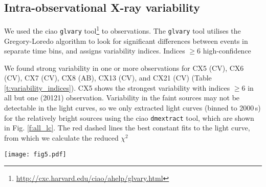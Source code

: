 \documentclass[fleqn,usenatbib]{mnras}
\newcommand{\craig}[1]{{\color{black}{#1}}}
\newcommand{\revised}[1]{{\color{black}{#1}}}
\begin{document}
\subsection{Intra-observational X-ray variability}
\label{sec:intra_observational_variability}
We used the {\sc ciao} {\tt glvary} tool\footnote{\url{http://cxc.harvard.edu/ciao/ahelp/glvary.html}} to 
\revised{search for variation of sources within} 
observations. The {\tt glvary} tool utilises the Gregory-Loredo algorithm \citep{Gregory92} to look for significant differences between events in separate time bins, and %
assigns variability indices. %
Indices %
$\geq 6$ %
\revised{indicate}
high-confidence \craig{($P>90$\% conf.)} 
\revised{variability.}

We found strong variability in one or more observations for CX5 (CV), CX6 (CV), CX7 (CV), CX8 (AB), CX13 (CV), and CX21 (CV) %
(Table \ref{t:variability_indices}). %
CX5 shows the strongest variability with indices $\geq 6$ in all but one (20121) observation. %
Variability in the faint sources may not be detectable in the light curves, so we only extracted light curves (binned to 2000\,s) for the relatively bright sources using the {\sc ciao} {\tt dmextract} tool, which are shown in Fig. \ref{f:all_lc}. The red dashed lines %
\revised{are}
the best constant fits to the light curve, from which we calculate the reduced $\chi^2$ 
\revised{to measure variability.}

\begin{figure*}
    \centering
    \texttt{[image: fig5.pdf]}
    \caption{0.5-7 keV X-ray light curves of sources with variability indices greater or equal to 6 in one or more Obs. IDs (Table \ref{t:variability_indices}). Each time bin is $2000~\mathrm{s}$ long.}
    \label{f:all_lc}
\end{figure*}
\end{document}
